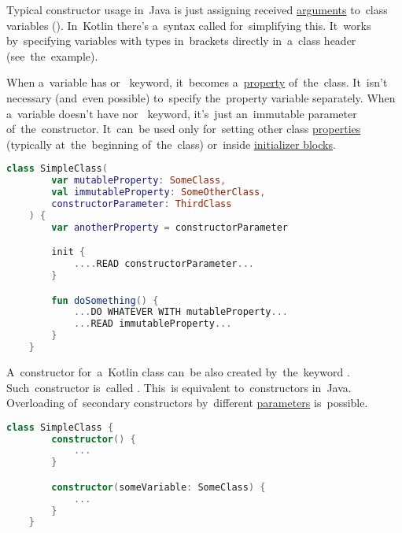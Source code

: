 \label{kotlinconstructor}
\label{kotlinprimaryconstructor}
Typical constructor usage in~Java is just assigning received \hyperref[parameterargument]{arguments} to~class variables ().
In~Kotlin there's a~syntax called  for~simplifying this.
It~works by~specifying variables with types in~brackets directly in~a~class header (see~the~example).

When a~variable has  \mbox{or } keyword, it~becomes \mbox{a \hyperref[variablefieldproperty]{property}} of~the~class.
It~isn't necessary (and~even possible) to~specify the~property variable separately.
When a~variable doesn't have  \mbox{nor } keyword, it's~just an~immutable parameter of~the~constructor.
It~can~be used only for~setting other class \hyperref[variablefieldproperty]{properties} (typically at~the~beginning of~the~class) or~inside \hyperref[kotlininitblock]{initializer blocks}.

\begin{lstlisting}[language=Kotlin]
    class SimpleClass(
        var mutableProperty: SomeClass,
        val immutableProperty: SomeOtherClass,
        constructorParameter: ThirdClass
    ) {
        var anotherProperty = constructorParameter

        init {
            ....READ constructorParameter...
        }

        fun doSomething() {
            ...DO WHATEVER WITH mutableProperty...
            ...READ immutableProperty...
        }
    }
\end{lstlisting}
\newpage

\label{kotlinsecondaryconstructor}
A~constructor for~a~Kotlin class can~be also created by~the~keyword .
Such~constructor is~called .
This~is equivalent to~constructors in~Java.
Overloading of~secondary constructors by~different \hyperref[parameterargument]{parameters} is~possible.

\begin{lstlisting}[language=Kotlin]
    class SimpleClass {
        constructor() {
            ...
        }

        constructor(someVariable: SomeClass) {
            ...
        }
    }
\end{lstlisting}

